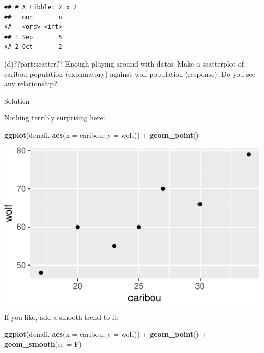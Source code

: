 \documentclass[]{tufte-book}
\newenvironment{Shaded}{}{}
\newcommand{\DataTypeTok}[1]{\textcolor[rgb]{0.56,0.13,0.00}{#1}}
\newcommand{\KeywordTok}[1]{\textcolor[rgb]{0.00,0.44,0.13}{\textbf{#1}}}
\newcommand{\NormalTok}[1]{#1}
\newcommand{\OperatorTok}[1]{\textcolor[rgb]{0.40,0.40,0.40}{#1}}
\newcommand{\StringTok}[1]{\textcolor[rgb]{0.25,0.44,0.63}{#1}}
\theoremstyle{definition}
\theoremstyle{definition}
\theoremstyle{definition}
\theoremstyle{remark}
\begin{document}
\begin{verbatim}
## # A tibble: 2 x 2
##   mon       n
##   <ord> <int>
## 1 Sep       5
## 2 Oct       2
\end{verbatim}

(d)??part:scatter?? Enough playing around with dates. Make a scatterplot
of caribou population (explanatory) against wolf population (response).
Do you see any relationship?

Solution

Nothing terribly surprising here:

\begin{Shaded}
\begin{Highlighting}[]
\KeywordTok{ggplot}\NormalTok{(denali, }\KeywordTok{aes}\NormalTok{(}\DataTypeTok{x =}\NormalTok{ caribou, }\DataTypeTok{y =}\NormalTok{ wolf)) }\OperatorTok{+}\StringTok{ }\KeywordTok{geom_point}\NormalTok{()}
\end{Highlighting}
\end{Shaded}

\includegraphics{13-dates-and-times_files/figure-latex/unnamed-chunk-31-1}

If you like, add a smooth trend to it:

\begin{Shaded}
\begin{Highlighting}[]
\KeywordTok{ggplot}\NormalTok{(denali, }\KeywordTok{aes}\NormalTok{(}\DataTypeTok{x =}\NormalTok{ caribou, }\DataTypeTok{y =}\NormalTok{ wolf)) }\OperatorTok{+}\StringTok{ }\KeywordTok{geom_point}\NormalTok{() }\OperatorTok{+}\StringTok{ }
\StringTok{    }\KeywordTok{geom_smooth}\NormalTok{(}\DataTypeTok{se =}\NormalTok{ F)}
\end{Highlighting}
\end{Shaded}
\end{document}
